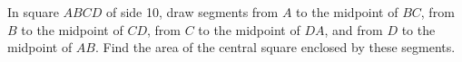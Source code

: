 In square $ABCD$ of side 10, draw segments from $A$ to the midpoint of $BC$, from $B$ to the midpoint of $CD$, from $C$ to the midpoint of $DA$, and from $D$ to the midpoint of $AB$. Find the area of the central square enclosed by these segments.
